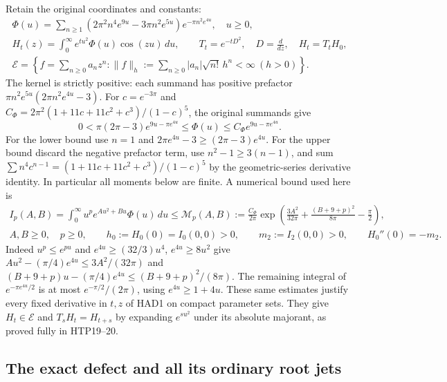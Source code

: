 Retain the original coordinates and constants:
\begin{equation}\tag{HAD1}
\begin{gathered}
 \Phi(u)=\sum_{n\ge1}(2\pi^2n^4e^{9u}-3\pi n^2e^{5u})
                                      e^{-\pi n^2e^{4u}},\quad u\ge0,\\
 H_t(z)=\int_0^\infty e^{tu^2}\Phi(u)\cos(zu)\,du,
 \qquad T_t=e^{-tD^2},\quad D=\frac{d}{dz},\quad H_t=T_tH_0,\\
 \mathcal E=\left\{f=\sum_{n\ge0}a_nz^n:
 \|f\|_h:=\sum_{n\ge0}|a_n|\sqrt{n!}\,h^n<\infty\ (h>0)\right\}.
\end{gathered}
\end{equation}
The kernel is strictly positive: each summand has positive
prefactor $\pi n^2e^{5u}(2\pi n^2e^{4u}-3)$.
For $c=e^{-3\pi}$ and
$C_\Phi=2\pi^2(1+11c+11c^2+c^3)/(1-c)^5$, the original
summands give
\[
 0<\pi(2\pi-3)e^{9u-\pi e^{4u}}
 \le\Phi(u)\le C_\Phi e^{9u-\pi e^{4u}}.
\]
For the lower bound use $n=1$ and
$2\pi e^{4u}-3\ge(2\pi-3)e^{4u}$.
For the upper bound discard the negative prefactor term,
use $n^2-1\ge3(n-1)$, and sum
$\sum n^4c^{n-1}=(1+11c+11c^2+c^3)/(1-c)^5$ by the
geometric-series derivative identity.
In particular all moments below are finite. A numerical
bound used here is
\begin{equation}\tag{HAD2}
\begin{gathered}
 I_p(A,B)=\int_0^\infty u^p e^{Au^2+Bu}\Phi(u)\,du
 \le\mathcal M_p(A,B):=
 \frac{C_\Phi}{2\pi}
 \exp\left(\frac{3A^2}{32\pi}
            +\frac{(B+9+p)^2}{8\pi}-\frac\pi2\right),\\
 A,B\ge0,\quad p\ge0,\qquad
 h_0:=H_0(0)=I_0(0,0)>0,\qquad m_2:=I_2(0,0)>0,
 \qquad H_0''(0)=-m_2.
\end{gathered}
\end{equation}
Indeed $u^p\le e^{pu}$ and
$e^{4u}\ge(32/3)u^4$, $e^{4u}\ge8u^2$ give
$Au^2-(\pi/4)e^{4u}\le3A^2/(32\pi)$ and
$(B+9+p)u-(\pi/4)e^{4u}\le(B+9+p)^2/(8\pi)$.
The remaining integral of $e^{-\pi e^{4u}/2}$ is at most
$e^{-\pi/2}/(2\pi)$, using $e^{4u}\ge1+4u$.
These same estimates justify every fixed derivative in $t,z$
of HAD1 on compact parameter sets. They give $H_t\in\mathcal E$
and $T_sH_t=H_{t+s}$ by expanding $e^{su^2}$ under its
absolute majorant, as proved fully in HTP19--20.

\subsection{The exact defect and all its ordinary root jets}

